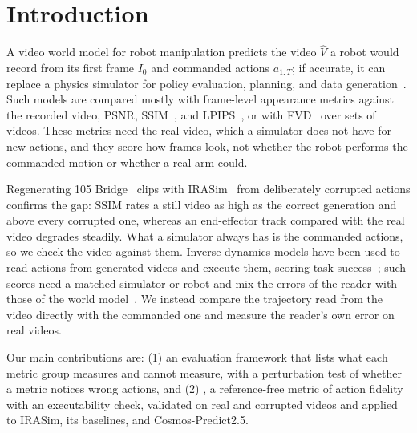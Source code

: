 \section{Introduction}
\label{sec:intro}

A video world model for robot manipulation predicts the video $\hat V$ a robot would record from its first frame $I_0$ and commanded actions $a_{1:T}$; if accurate, it can replace a physics simulator for policy evaluation, planning, and data generation~\cite{yang2023unisim,zhu2024irasim,nvidia2025cosmos}.
Such models are compared mostly with frame-level appearance metrics against the recorded video, PSNR, SSIM~\cite{wang2004ssim}, and LPIPS~\cite{zhang2018lpips}, or with FVD~\cite{unterthiner2018fvd} over sets of videos.
These metrics need the real video, which a simulator does not have for new actions, and they score how frames look, not whether the robot performs the commanded motion or whether a real arm could.

Regenerating 105 Bridge~\cite{walke2023bridgedata} clips with IRASim~\cite{zhu2024irasim} from deliberately corrupted actions confirms the gap: SSIM rates a still video as high as the correct generation and above every corrupted one, whereas an end-effector track compared with the real video degrades steadily.
What a simulator always has is the commanded actions, so we check the video against them.
Inverse dynamics models have been used to read actions from generated videos and execute them, scoring task success~\cite{qin2024worldsimbench,fan2026wowwoval,zhang2026worldinworld}; such scores need a matched simulator or robot and mix the errors of the reader with those of the world model~\cite{liu2026kinebench}.
We instead compare the trajectory read from the video directly with the commanded one and measure the reader's own error on real videos.

Our main contributions are: (1) an evaluation framework that lists what each metric group measures and cannot measure, with a perturbation test of whether a metric notices wrong actions, and (2) \ours{}, a reference-free metric of action fidelity with an executability check, validated on real and corrupted videos and applied to IRASim, its baselines, and Cosmos-Predict2.5.

